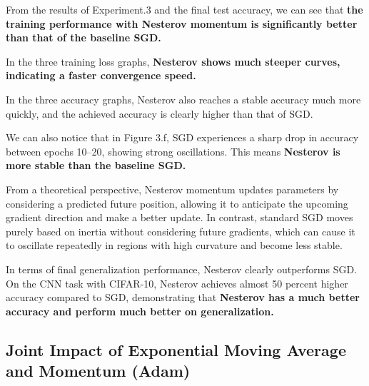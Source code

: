 \documentclass[12pt]{article}
\begin{document}
From the results of Experiment.3 and the final test accuracy, we can see that \textbf{the training performance with Nesterov momentum is significantly better than that of the baseline SGD.}

In the three training loss graphs, \textbf{Nesterov shows much steeper curves, indicating a faster convergence speed.}

In the three accuracy graphs, Nesterov also reaches a stable accuracy much more quickly, and the achieved accuracy is clearly higher than that of SGD.

We can also notice that in Figure 3.f, SGD experiences a sharp drop in accuracy between epochs 10–20, showing strong oscillations. This means \textbf{Nesterov is more stable than the baseline SGD.}

From a theoretical perspective, Nesterov momentum updates parameters by considering a predicted future position, allowing it to anticipate the upcoming gradient direction and make a better update. In contrast, standard SGD moves purely based on inertia without considering future gradients, which can cause it to oscillate repeatedly in regions with high curvature and become less stable.

In terms of final generalization performance, Nesterov clearly outperforms SGD. On the CNN task with CIFAR-10, Nesterov achieves almost 50 percent higher accuracy compared to SGD, demonstrating that \textbf{Nesterov has a much better accuracy and perform much better on generalization.}


\subsection{Joint Impact of Exponential Moving Average and Momentum (Adam)}
\end{document}
